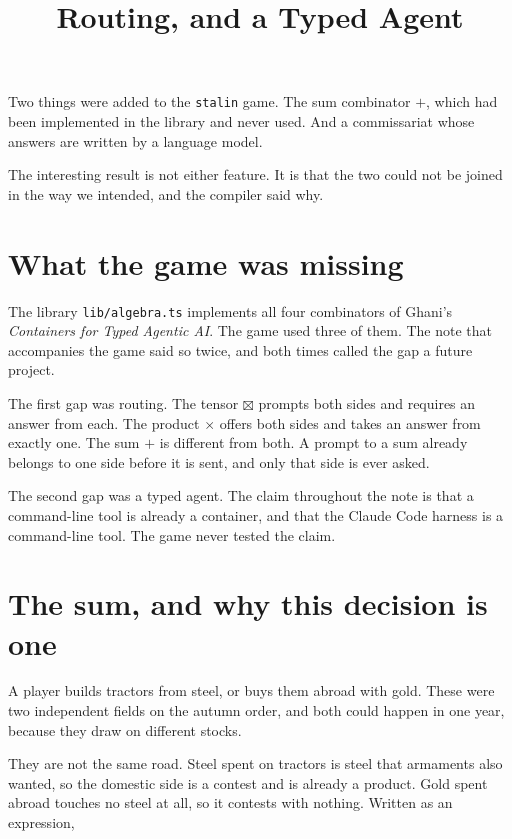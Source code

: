 \documentclass[11pt,a4paper]{article}
\title{\vspace{-2em}Routing, and a Typed Agent}
\author{}
\date{}
\begin{document}
\maketitle
\vspace{-3em}

\begin{sectionbox}
Two things were added to the \texttt{stalin} game. The sum combinator $+$, which had been
implemented in the library and never used. And a commissariat whose answers are written by a
language model.

The interesting result is not either feature. It is that the two could not be joined in the
way we intended, and the compiler said why.
\end{sectionbox}

\section{What the game was missing}

The library \texttt{lib/algebra.ts} implements all four combinators of Ghani's
\emph{Containers for Typed Agentic AI}. The game used three of them. The note that accompanies
the game said so twice, and both times called the gap a future project.

The first gap was routing. The tensor $\boxtimes$ prompts both sides and requires an answer
from each. The product $\times$ offers both sides and takes an answer from exactly one. The
sum $+$ is different from both. A prompt to a sum already belongs to one side before it is
sent, and only that side is ever asked.

The second gap was a typed agent. The claim throughout the note is that a command-line tool is
already a container, and that the Claude Code harness is a command-line tool. The game never
tested the claim.

\section{The sum, and why this decision is one}

A player builds tractors from steel, or buys them abroad with gold. These were two independent
fields on the autumn order, and both could happen in one year, because they draw on different
stocks.

They are not the same road. Steel spent on tractors is steel that armaments also wanted, so the
domestic side is a contest and is already a product. Gold spent abroad touches no steel at all,
so it contests with nothing. Written as an expression,
\end{document}
